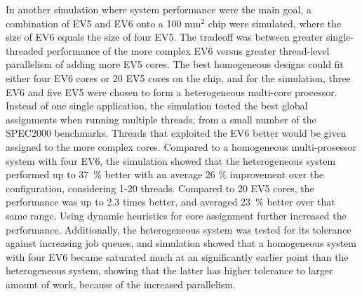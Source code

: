 In another simulation where system performance were the main goal, a combination of EV5 and EV6 onto a 100 mm$^2$ chip were simulated, where the size of EV6 equals the size of four EV5.
The tradeoff was between greater single-threaded performance of the more complex EV6 versus greater thread-level parallelism of adding more EV5 cores.
The best homogeneous designs could fit either four EV6 cores or 20 EV5 cores on the chip, and for the simulation, three EV6 and five EV5 were chosen to form a heterogeneous multi-core processor.
Instead of one single application, the simulation tested the best global assignments when running multiple threads, from a small number of the SPEC2000 benchmarks.
Threads that exploited the EV6 better would be given assigned to the more complex cores.
Compared to a homogeneous multi-prosessor system with four EV6, the simulation showed that the heterogeneous system performed up to 37~\% better with an average 26 \% improvement over the configuration, considering 1-20 threads.
Compared to 20 EV5 cores, the performance was up to 2.3 times better, and averaged 23~\% better over that same range.
Using dynamic heuristics for core assignment further increased the performance.
Additionally, the heterogeneous system was tested for its tolerance against increasing job queues, and simulation showed that a homogeneous system with four EV6 became saturated much at an significantly earlier point than the heterogeneous system, showing that the latter has higher tolerance to larger amount of work, because of the increased parallelism.
\cite{heterogeneous-perf}



